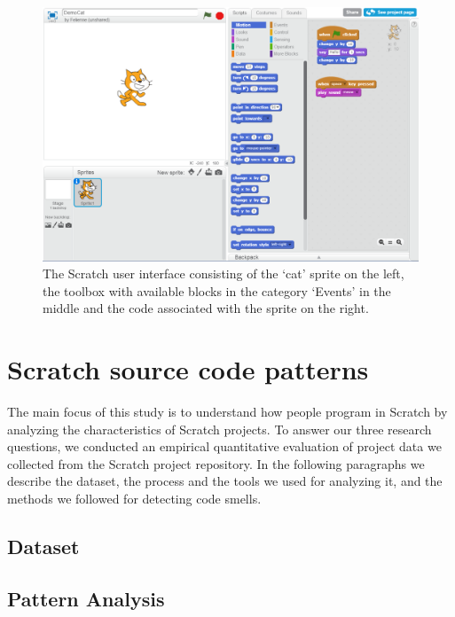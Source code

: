 \documentclass[preprint]{sigplanconf}
\begin{document}
\begin{figure}
	\begin{center}
		\includegraphics[width=\columnwidth]{fig/ui.png}
		\vspace{-1em}
		\caption{The Scratch user interface consisting of the `cat' sprite on the left, the toolbox with available blocks in the category `Events' in the middle and the code associated with the sprite on the right.}
		\label{fig:ui}
	\end{center}
\end{figure} 

\section{Scratch source code patterns}
\label{sec:Patterns}

The main focus of this study is to understand how people program in Scratch by analyzing the characteristics of Scratch projects. To answer our three research questions, we conducted an empirical quantitative evaluation of project data we collected from the Scratch project repository. In the following paragraphs we describe the dataset, the process and the tools we used for analyzing it, and the methods we followed for detecting code smells.

\subsection{Dataset}
\label{dataset}

\subsection{Pattern Analysis}
\end{document}
